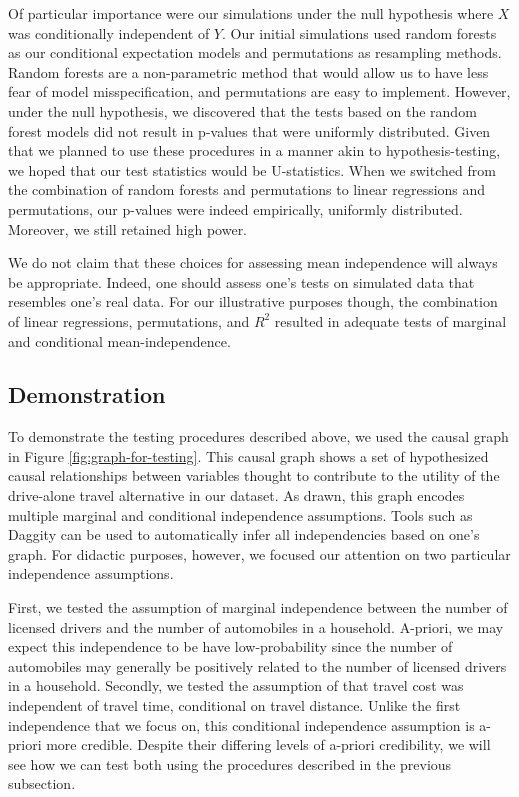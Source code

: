 Of particular importance were our simulations under the null hypothesis where $X$ was conditionally independent of $Y$.
Our initial simulations used random forests as our conditional expectation models and permutations as resampling methods.
Random forests are a non-parametric method that would allow us to have less fear of model misspecification, and permutations are easy to implement.
However, under the null hypothesis, we discovered that the tests based on the random forest models did not result in p-values that were uniformly distributed.
Given that we planned to use these procedures in a manner akin to hypothesis-testing, we hoped that our test statistics would be U-statistics.
When we switched from the combination of random forests and permutations to linear regressions and permutations, our p-values were indeed empirically, uniformly distributed.
Moreover, we still retained high power.

We do not claim that these choices for assessing mean independence will always be appropriate.
Indeed, one should assess one's tests on simulated data that resembles one's real data.
For our illustrative purposes though, the combination of linear regressions, permutations, and $R^2$ resulted in adequate tests of marginal and conditional mean-independence.

\subsection{Demonstration}
To demonstrate the testing procedures described above, we used the causal graph in Figure \ref{fig:graph-for-testing}.
This causal graph shows a set of hypothesized causal relationships between variables thought to contribute to the utility of the drive-alone travel alternative in our dataset.
As drawn, this graph encodes multiple marginal and conditional independence assumptions.
Tools such as Daggity \citep{textor_2016_robust} can be used to automatically infer all independencies based on one's graph.
For didactic purposes, however, we focused our attention on two particular independence assumptions.

First, we tested the assumption of marginal independence between the number of licensed drivers and the number of automobiles in a household.
A-priori, we may expect this independence to be have low-probability since the number of automobiles may generally be positively related to the number of licensed drivers in a household.
Secondly, we tested the assumption of that travel cost was independent of travel time, conditional on travel distance.
Unlike the first independence that we focus on, this conditional independence assumption is a-priori more credible.
Despite their differing levels of a-priori credibility, we will see how we can test both using the procedures described in the previous subsection.

